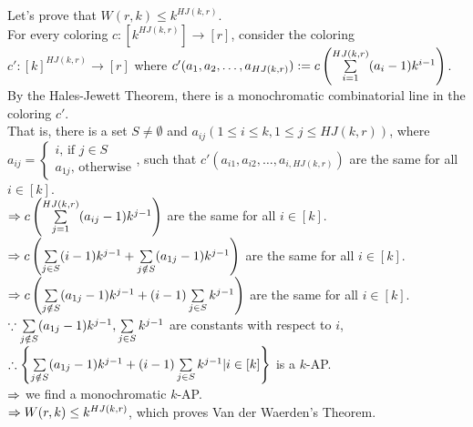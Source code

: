 \begin{pr}
Let's prove that $W(r, k)\leq k^{HJ(k, r)}$.\\
For every coloring $c:[k^{HJ(k, r)}]\to[r]$, consider the coloring $c':[k]^{HJ(k, r)}\to[r]$ where $c'(a_1, a_2, \dots, a_{HJ(k, r)}):=c\left(\sum\limits_{i=1}^{HJ(k, r)}(a_i-1)k^{i-1}\right)$.\\
By the Hales-Jewett Theorem, there is a monochromatic combinatorial line in the coloring $c'$.\\
That is, there is a set $S\neq\emptyset$ and $a_{ij}(1\leq i\leq k, 1\leq j\leq HJ(k, r))$, where $a_{ij}=\begin{cases}i\text{, if }j\in S\\a_{1j}\text{, otherwise}\end{cases}$, such that $c'(a_{i1}, a_{i2}, \dots, a_{i, HJ(k, r)})$ are the same for all $i\in[k]$.\\
$\Rightarrow c\left(\sum\limits_{j=1}^{HJ(k, r)}(a_{ij}-1)k^{j-1}\right)$ are the same for all $i\in[k]$.\\
$\Rightarrow c\left(\sum\limits_{j\in S}(i-1)k^{j-1}+\sum\limits_{j\notin S}(a_{1j}-1)k^{j-1}\right)$ are the same for all $i\in[k]$.\\
$\Rightarrow c\left(\sum\limits_{j\notin S}(a_{1j}-1)k^{j-1}+(i-1)\sum\limits_{j\in S}k^{j-1}\right)$ are the same for all $i\in[k]$.\\
$\because\sum\limits_{j\notin S}(a_{1j}-1)k^{j-1}, \sum\limits_{j\in S}k^{j-1}$ are constants with respect to $i$,\\
$\therefore\left\{\sum\limits_{j\notin S}(a_{1j}-1)k^{j-1}+(i-1)\sum\limits_{j\in S}k^{j-1}|i\in[k]\right\}$ is a $k$-AP.\\
$\Rightarrow$ we find a monochromatic $k$-AP.\\
$\Rightarrow W(r, k)\leq k^{HJ(k, r)}$, which proves Van der Waerden's Theorem.
\end{pr}
